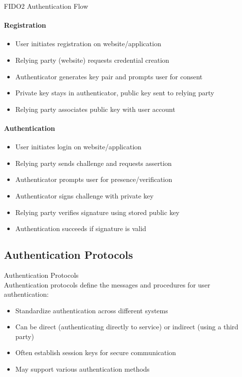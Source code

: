 \begin{KR}{FIDO2 Authentication Flow}\\
\paragraph{Registration}
\begin{itemize}
    \item User initiates registration on website/application
    \item Relying party (website) requests credential creation
    \item Authenticator generates key pair and prompts user for consent
    \item Private key stays in authenticator, public key sent to relying party
    \item Relying party associates public key with user account
\end{itemize}

\paragraph{Authentication}
\begin{itemize}
    \item User initiates login on website/application
    \item Relying party sends challenge and requests assertion
    \item Authenticator prompts user for presence/verification
    \item Authenticator signs challenge with private key
    \item Relying party verifies signature using stored public key
    \item Authentication succeeds if signature is valid
\end{itemize}
\end{KR}

\subsection{Authentication Protocols}

\begin{definition}{Authentication Protocols}\\
Authentication protocols define the messages and procedures for user authentication:
\begin{itemize}
    \item Standardize authentication across different systems
    \item Can be direct (authenticating directly to service) or indirect (using a third party)
    \item Often establish session keys for secure communication
    \item May support various authentication methods
\end{itemize}
\end{definition}

